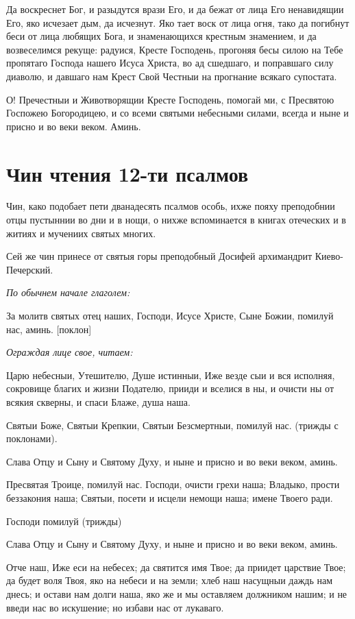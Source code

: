 Да воскреснет Бог, и разыдутся врази Его, и да бежат от лица Его ненавидящии Его, яко исчезает дым, да исчезнут. Яко тает воск от лица огня, тако да погибнут беси от лица любящих Бога, и знаменающихся крестным знамением, и да возвеселимся рекуще: радуися, Кресте Господень, прогоняя бесы силою на Тебе пропятаго Господа нашего Исуса Христа, во ад сшедшаго, и поправшаго силу диаволю, и давшаго нам Крест Свой Честныи на прогнание всякаго супостата.


О! Пречестныи и Животворящии Кресте Господень, помогай ми, с Пресвятою Госпожею Богородицею, и со всеми святыми небесными силами, всегда и ныне и присно и во веки веком. Аминь.


\section{Чин чтения 12-ти псалмов}
 


Чин, како подобает пети дванадесять псалмов особь, ихже пояху преподобнии отцы пустыннии во дни и в нощи, о нихже вспоминается в книгах отеческих и в житиях и мучениих святых многих.


Сей же чин принесе от святыя горы преподобный Досифей архимандрит Киево-Печерский.


\itshape По обычнем начале глаголем: \normalfont{}


За молитв святых отец наших, Господи, Исусе Христе, Сыне Божии, помилуй нас, аминь. [поклон]


\itshape Ограждая лице свое, читаем:\normalfont{}


Царю небесныи, Утешителю, Душе истинныи, Иже везде сыи и вся исполняя, сокровище благих и жизни Подателю, прииди и вселися в ны, и очисти ны от всякия скверны, и спаси Блаже, душа наша.

Святыи Боже, Святыи Крепкии, Святыи Безсмертныи, помилуй нас. (трижды с поклонами).

Слава Отцу и Сыну и Святому Духу, и ныне и присно и во веки веком, аминь.

Пресвятая Троице, помилуй нас. Господи, очисти грехи наша; Владыко, прости беззакония наша; Святыи, посети и исцели немощи наша; имене Твоего ради.

Господи помилуй (трижды)

Слава Отцу и Сыну и Святому Духу, и ныне и присно и во веки веком, аминь.

Отче наш, Иже еси на небесех; да святится имя Твое; да приидет царствие Твое; да будет воля Твоя, яко на небеси и на земли; хлеб наш насущныи даждь нам днесь; и остави нам долги наша, яко же и мы оставляем должником нашим; и не введи нас во искушение; но избави нас от лукаваго.

